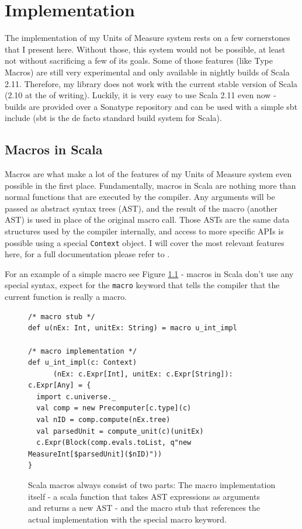 \documentclass[12pt,oneside,a4paper]{scrbook}
\theoremstyle{definition}
\begin{document}
\chapter{Implementation}

The implementation of my Units of Measure system rests on a few cornerstones that I present here. Without those, this system would not be possible, at least not without sacrificing a few of its goals. Some of those features (like Type Macros) are still very experimental and only available in nightly builds of Scala 2.11. Therefore, my library does not work with the current stable version of Scala (2.10 at the of writing). Luckily, it is very easy to use Scala 2.11 even now - builds are provided over a Sonatype repository and can be used with a simple sbt include (sbt is the de facto standard build system for Scala).

\section{Macros in Scala}

Macros are what make a lot of the features of my Units of Measure system even possible in the first place. Fundamentally, macros in Scala are nothing more than normal functions that are executed by the compiler. Any arguments will be passed as abstract syntax trees (AST), and the result of the macro (another AST) is used in place of the original macro call. Those ASTs are the same data structures used by the compiler internally, and access to more specific APIs is possible using a special \verb|Context| object. I will cover the most relevant features here, for a full documentation please refer to \citep{Eugene13}.

For an example of a simple macro see Figure \ref{code:scala_macro} - macros in Scala don't use any special syntax, expect for the \verb|macro| keyword that tells the compiler that the current function is really a macro.



\begin{figure}
\begin{verbatim}
/* macro stub */
def u(nEx: Int, unitEx: String) = macro u_int_impl

/* macro implementation */
def u_int_impl(c: Context)
      (nEx: c.Expr[Int], unitEx: c.Expr[String]): c.Expr[Any] = {
  import c.universe._
  val comp = new Precomputer[c.type](c)
  val nID = comp.compute(nEx.tree)
  val parsedUnit = compute_unit(c)(unitEx)
  c.Expr(Block(comp.evals.toList, q"new MeasureInt[$parsedUnit]($nID)"))
}
\end{verbatim}
\caption{Scala macros always consist of two parts: The macro implementation itself - a scala function that takes AST expressions as arguments and returns a new AST - and the macro stub that references the actual implementation with the special macro keyword.}
\label{code:scala_macro}
\end{figure}
\end{document}
